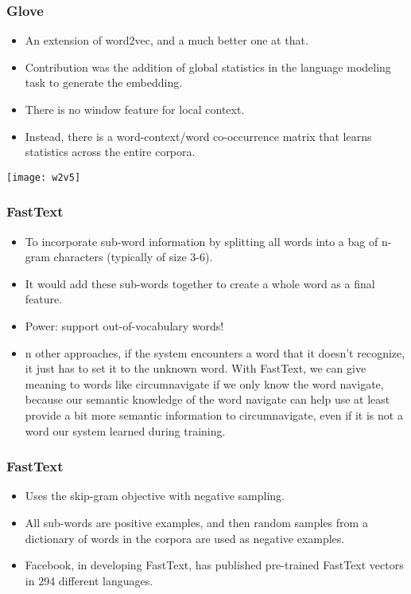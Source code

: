 \begin{frame}[fragile]\frametitle{Glove}
  \begin{itemize}
    \item An extension of word2vec, and a much better one at that.
	\item Contribution was the addition of global statistics in the language modeling task to generate the embedding. 
	\item There is no window feature for local context. 
	\item Instead, there is a word-context/word co-occurrence matrix that learns statistics across the entire corpora.
  \end{itemize}
  
\begin{center}
\texttt{[image: w2v5]}
\end{center}
  
\end{frame}

\begin{frame}[fragile]\frametitle{FastText}
  \begin{itemize}
    \item To incorporate sub-word information by splitting all words into a bag of n-gram characters (typically of size 3-6). 
	\item It would add these sub-words together to create a whole word as a final feature. 
	\item Power: support out-of-vocabulary words! 
	\item n other approaches, if the system encounters a word that it doesn’t recognize, it just has to set it to the unknown word. With FastText, we can give meaning to words like circumnavigate if we only know the word navigate, because our semantic knowledge of the word navigate can help use at least provide a bit more semantic information to circumnavigate, even if it is not a word our system learned during training.
  \end{itemize}
  
 
\end{frame}

\begin{frame}[fragile]\frametitle{FastText}
  \begin{itemize}
    \item Uses the skip-gram objective with negative sampling. 
	\item All sub-words are positive examples, and then random samples from a dictionary of words in the corpora are used as negative examples.
	\item Facebook, in developing FastText, has published pre-trained FastText vectors in 294 different languages.
  \end{itemize}
  
 
\end{frame}


